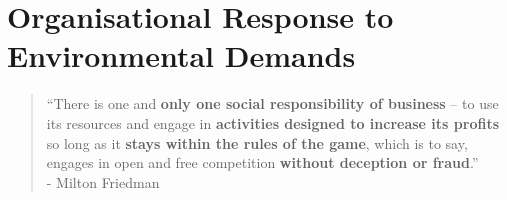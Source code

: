 \documentclass[11pt]{article}
\theoremstyle{definition}
\begin{document}
\section{Organisational Response to Environmental Demands}

\begin{quote}
	\textquotedblleft There is one and \textbf{only one social responsibility of business} -- to use its resources and engage in \textbf{activities designed to increase its profits} so long as it \textbf{stays within the rules of the game}, which is to say, engages in open and free competition \textbf{without deception or fraud}.\textquotedblright\\
	\hspace*{1em} - Milton Friedman
\end{quote}
\end{document}
